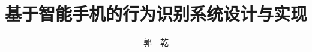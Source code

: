 ﻿\documentclass[master,twoside,openright]{ustcthesis}
\title{基于智能手机的行为识别系统设计与实现}%
\author{郭\ \ 乾}
\begin{document}
  \maketitle
\frontmatter
\makeatletter
\ifustc@bachelor
	
	
	\tableofcontents

	\ustclot
	\ustclof
	
\else
	\tableofcontents

	\ustclot
	\ustclof
	
\fi
\makeatother

\mainmatter

  
  

  
  
  
  
\backmatter

  
  \nocite{*} %

%    
%

  \makeatletter
  \ifustc@bachelor\relax\else
    \fi
  \makeatother
\end{document}
